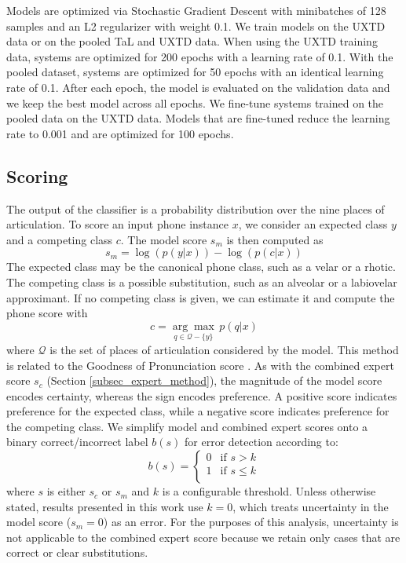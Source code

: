 Models are optimized via Stochastic Gradient Descent with minibatches of 128 samples and an L2 regularizer with weight 0.1.
We train models on the UXTD data or on the pooled TaL and UXTD data.
When using the UXTD training data, systems are optimized for 200 epochs with a learning rate of 0.1.
With the pooled dataset, systems are optimized for 50 epochs with an identical learning rate of 0.1.
After each epoch, the model is evaluated on the validation data and we keep the best model across all epochs.
We fine-tune systems trained on the pooled data on the UXTD data.
Models that are fine-tuned reduce the learning rate to 0.001 and are optimized for 100 epochs.

\subsection{Scoring}


The output of the classifier is a probability distribution over the nine places of articulation.
To score an input phone instance $x$, we consider an expected class $y$ and a competing class $c$.
The model score $s_m$ is then computed as
%
\begin{equation}
    s_m = \log(p(y|x)) - \log(p(c|x))
\label{eq:model_score}
\end{equation}
%
The expected class may be the canonical phone class, such as a velar or a rhotic.
The competing class is a possible substitution, such as an alveolar or a labiovelar approximant.
If no competing class is given, we can estimate it and compute the phone score with
%
\begin{equation}
c = \underset{q \in \mathcal{Q} - \{ y \}}{\arg\max}\, p(q|x)
\label{eq:model_max_score}
\end{equation}
%
where $\mathcal{Q}$ is the set of places of articulation considered by the model.
This method is related to the Goodness of Pronunciation score \citep{witt2000phone, hu2015improved}.
As with the combined expert score $s_c$ (Section \ref{subsec_expert_method}), 
the magnitude of the model score encodes certainty, whereas the sign encodes preference.
A positive score indicates preference for the expected class, while a negative score indicates preference for the competing class.
We simplify model and combined expert scores onto a binary correct/incorrect label $b(s)$ for error detection according to:
%
\begin{equation}
    b(s) =
    \begin{cases}
        0 & \text{if $s>k$} \\
        1 & \text{if $s\le k$} \\
    \end{cases}
\label{eq:model_binary}
\end{equation}
%
where $s$ is either $s_c$ or $s_m$ and $k$ is a configurable threshold.
Unless otherwise stated, results presented in this work use $k=0$, which treats uncertainty in the model score ($s_m=0$) as an error.
For the purposes of this analysis, uncertainty is not applicable to the combined expert score because we retain only cases that are correct or clear substitutions.

